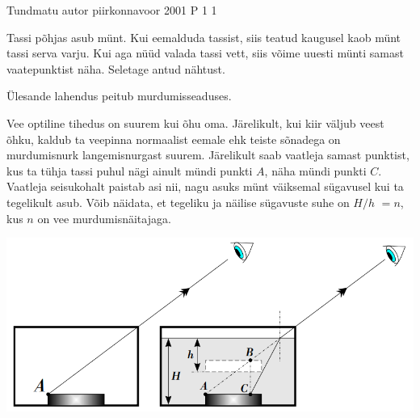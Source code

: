 {Tundmatu autor} %
{piirkonnavoor} %
{2001} %
{P 1} %
{1} %
{
\ifStatement
Tassi põhjas asub münt. Kui eemalduda tassist, siis teatud kaugusel kaob münt tassi serva varju. Kui aga nüüd valada tassi vett, siis võime uuesti münti samast vaatepunktist näha. Seletage antud nähtust.
\fi

\ifHint
Ülesande lahendus peitub murdumisseaduses.
\fi


\ifSolution
Vee optiline tihedus on suurem kui õhu oma. Järelikult, kui kiir väljub veest õhku, kaldub ta veepinna normaalist eemale ehk teiste sõnadega on murdumisnurk langemisnurgast suurem. Järelikult saab vaatleja samast punktist, kus ta tühja tassi puhul nägi ainult mündi punkti $A$, näha mündi punkti $C$. Vaatleja seisukohalt paistab asi nii, nagu asuks münt väiksemal sügavusel kui ta tegelikult asub. Võib näidata, et tegeliku ja näilise sügavuste suhe on $H/h$ $ = n$, kus $n$ on vee murdumisnäitajaga.
\begin{center}
	\includegraphics[width=0.5\linewidth]{2001-v2p-01-lah.PNG}
\end{center}
\fi
}